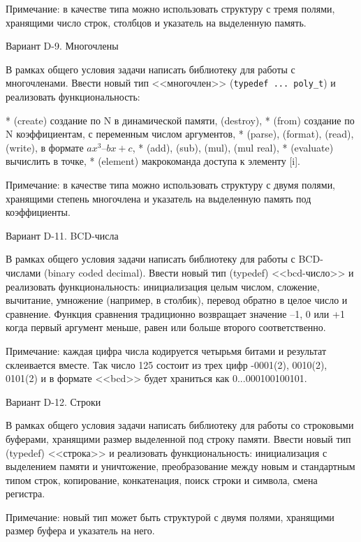 Примечание: в качестве типа можно использовать структуру с тремя полями,
хранящими число строк, столбцов и указатель на выделенную память.


Вариант D-9. Многочлены

В рамках общего условия задачи написать библиотеку для работы с многочленами.
Ввести новый тип <<многочлен>> (\verb|typedef ... poly_t|) и реализовать
функциональность:

* (create) создание по N в динамической памяти, (destroy),
* (from) создание по N коэффициентам, с переменным числом аргументов,
* (parse), (format), (read), (write), в формате $ax^3 – bx + c$,
* (add), (sub), (mul), (mul real),
* (evaluate) вычислить в точке,
* (element) макрокоманда доступа к элементу [i].

Примечание: в качестве типа можно использовать структуру с двумя полями,
хранящими степень многочлена и указатель на выделенную память под
коэффициенты.


Вариант D-11. BCD-числа

В рамках общего условия задачи написать библиотеку для работы с BCD-числами
(binary coded decimal). Ввести новый тип (typedef) <<bcd-число>> и реализовать
функциональность: инициализация целым числом, сложение, вычитание, умножение
(например, в столбик), перевод обратно в целое число и сравнение. Функция
сравнения традиционно возвращает значение –1, 0 или +1 когда первый аргумент
меньше, равен или больше второго соответственно.

Примечание: каждая цифра числа кодируется четырьмя битами и результат
склеивается вместе. Так число 125 состоит из трех цифр -0001(2), 0010(2),
0101(2) и в формате <<bcd>> будет храниться как 0...000100100101.


Вариант D-12. Строки

В рамках общего условия задачи написать библиотеку для работы со строковыми
буферами, хранящими размер выделенной под строку памяти. Ввести новый тип
(typedef) <<строка>> и реализовать функциональность: инициализация с выделением
памяти и уничтожение, преобразование между новым и стандартным типом строк,
копирование, конкатенация, поиск строки и символа, смена регистра.

Примечание: новый тип может быть структурой с двумя полями, хранящими размер
буфера и указатель на него.

